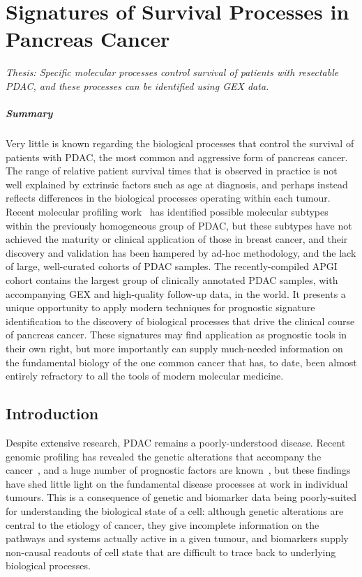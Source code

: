 \documentclass[dissertation.tex]{subfiles}
\begin{document}
\chapter[Signatures of Survival Processes in Pancreas Cancer][Survival Signatures]{Signatures of Survival Processes in Pancreas Cancer}
\label{chap:signatures}

\emph{Thesis: Specific molecular processes control survival of patients with resectable \acrlong{PDAC}, and these processes can be identified using \acrlong{GEX} data.}

\paragraph{Summary}Very little is known regarding the biological processes that control the survival of patients with \gls{PDAC}, the most common and aggressive form of pancreas cancer.  The range of relative patient survival times that is observed in practice is not well explained by extrinsic factors such as age at diagnosis, and perhaps instead reflects differences in the biological processes operating within each tumour.  Recent molecular profiling work~\cite{Collisson2011} has identified possible molecular subtypes within the previously homogeneous group of \gls{PDAC}, but these subtypes have not achieved the maturity or clinical application of those in breast cancer, and their discovery and validation has been hampered by ad-hoc methodology, and the lack of large, well-curated cohorts of \gls{PDAC} samples.  The recently-compiled \gls{APGI} cohort contains the largest group of clinically annotated \gls{PDAC} samples, with accompanying \gls{GEX} and high-quality follow-up data, in the world.  It presents a unique opportunity to apply modern techniques for prognostic signature identification to the discovery of biological processes that drive the clinical course of pancreas cancer.  These signatures may find application as prognostic tools in their own right, but more importantly can supply much-needed information on the fundamental biology of the one common cancer that has, to date, been almost entirely refractory to all the tools of modern molecular medicine.

\section{Introduction}
Despite extensive research, \gls{PDAC} remains a poorly-understood disease.  Recent genomic profiling has revealed the genetic alterations that accompany the cancer~\cite{Biankin2012}, and a huge number of prognostic factors are known~\cite{Harsha2009}, but these findings have shed little light on the fundamental disease processes at work in individual tumours.  This is a consequence of genetic and biomarker data being poorly-suited for understanding the biological state of a cell: although genetic alterations are central to the etiology of cancer, they give incomplete information on the pathways and systems actually active in a given tumour, and biomarkers supply non-causal readouts of cell state that are difficult to trace back to underlying biological processes.
\end{document}
